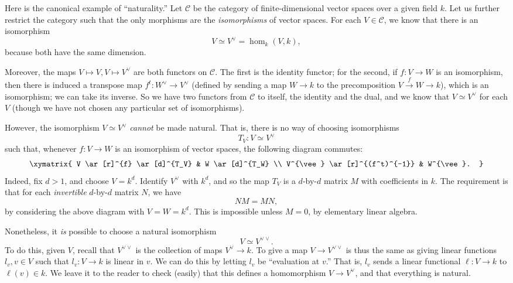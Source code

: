 \begin{example}
Here is the canonical example of ``naturality.''
Let $\mathcal{C}$ be the category of finite-dimensional vector spaces over a
given field $k$. Let us further restrict the category such that the only
morphisms are the \emph{isomorphisms} of vector spaces.
For each $V \in \mathcal{C}$, we know that there is an isomorphism
\[ V \simeq V^{\vee} = \hom_k(V, k),  \]
because both have the same dimension. 

Moreover, the maps $V \mapsto V, V \mapsto V^{\vee}$ are both functors on
$\mathcal{C}$. The first is the identity functor; for the second, if $f: V \to
W$ is an isomorphism, then there is induced a transpose map $f^t: W^{\vee} \to V^{\vee}$
(defined by sending a map $W \to k$ to the precomposition $V \stackrel{f}{\to}
W \to k$), which is an isomorphism; we can take its inverse.
So we have two functors from $\mathcal{C}$ to itself, the identity and the
dual, and we know that $V \simeq V^{\vee}$ for each $V$ (though we have not
chosen any particular set of isomorphisms).


However, the isomorphism $V \simeq
V^{\vee}$ \emph{cannot} be made natural. That is, there is no way of choosing
isomorphisms
\[ T_V: V \simeq V^{\vee}  \]
such that, 
whenever $f: V \to W$ is an isomorphism of vector spaces, the following diagram
commutes:
\[ \xymatrix{
V \ar[r]^{f} \ar[d]^{T_V}  &  W \ar[d]^{T_W} \\
V^{\vee} \ar[r]^{(f^t)^{-1}} &  W^{\vee}.
}\]
Indeed, fix $d>1$, and choose $V = k^d$. 
Identify $V^{\vee}$ with $k^d$, and so the map $T_V$ is a $d$-by-$d$ matrix $M$
with coefficients in $k$. The requirement is that for each \emph{invertible}
$d$-by-$d$ matrix $N$, we have
\[ NM = MN,  \]
by considering the above diagram with $V = W = k^d$.
This is impossible unless $M = 0$, by elementary linear algebra.

Nonetheless, it \emph{is} possible to choose a natural isomorphism
\[ V \simeq V^{\vee \vee}.  \]
To do this, given $V$, recall that $V^{\vee \vee}$ is the collection of maps
$V^{\vee} \to k$. To give a map $V \to V^{\vee \vee}$ is thus the same as
giving linear functions $l_v, v \in V$ such that $l_v: V \to k$ is linear in
$v$. We can do this by letting $l_v$ be ``evaluation at $v$.''
That is, $l_v$ sends a linear functional $\ell: V \to k$ to $\ell(v) \in k$. We
leave it to the reader to check (easily) that this defines a homomorphism $V
\to V^{\vee}$, and that everything is natural.
\end{example}





